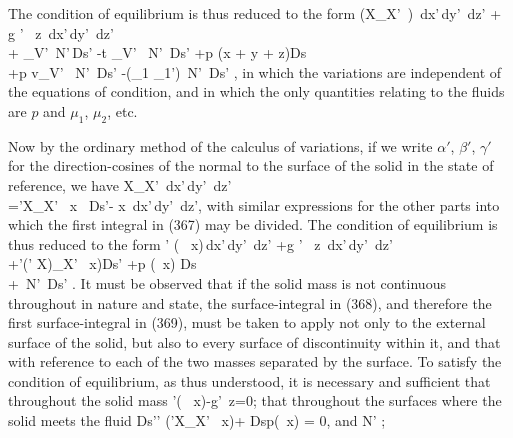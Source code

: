\documentclass[12pt]{article}
\begin{document}
The condition of equilibrium is thus reduced to the form
\eqs \int \int \int \left(X_{X'}\, \delta {} \right) \,dx'\,dy'\, dz' + \int \int \int g \Gamma' \, \delta z \,dx'\,dy'\, dz'\\
+ \int \epsilon_{V'} \,\delta N'\,Ds' -\int t \eta_{V'} \, \delta N'\, Ds' +\int p \left(\alpha \delta x + \beta \delta y + \gamma \delta z\right)Ds\\
+\int p v_{V'} \, \delta N'\, Ds' -\int (\mu_1 \Gamma_1')\, \delta N'\, Ds'  , \label{367}\eqe
in which the variations are independent of the equations of condition, and in which the only quantities relating to the fluids are $p$ and $\mu_1$, $\mu_2$, etc.


Now by the ordinary method of the calculus of variations, if we write $\alpha'$, $\beta'$, $\gamma'$ for the direction-cosines of the normal to the surface of the solid in the state of reference, we have
\eqs \int \int \int X_{X'} \delta {} \,dx'\,dy'\, dz'\\
=\int \alpha'X_{X'} \, \delta x \, Ds'-\int \int \int  {} \delta x \,dx'\,dy'\, dz', \label{368}\eqe
with similar expressions for the other parts into which the first integral in (367) may be divided. The condition of equilibrium is thus reduced to the form
\eqs \int \int \int \sum \sum\nolimits' \left(  \, \delta x\right)\,dx'\,dy'\, dz' 
+\int \int \int g \Gamma' \, \delta z \,dx'\,dy'\, dz'\\
+\int \sum \sum\nolimits'(\alpha' X)_{X'} \, \delta x)Ds' +\int p \sum (\alpha \, \delta x) Ds\\
+\int {} \, \delta N'\, Ds' .   \label{369}\eqe
It must be observed that if the solid mass is not continuous throughout in nature and state, the surface-integral in (368), and therefore the first surface-integral in (369), must be taken to apply not only to the external surface of the solid, but also to every surface of discontinuity within it, and that with reference to each of the two masses separated by the surface. To satisfy the condition of equilibrium, as thus understood, it is necessary and sufficient that throughout the solid mass
\eqs \sum \sum\nolimits'\left(  \, \delta x\right)-g\Gamma' \,\delta z=0;       \label{370}\eqe
that throughout the surfaces where the solid meets the fluid
\eqs Ds'\sum \sum\nolimits' (\alpha'X_{X'} \, \delta x)+ Dsp\sum(\alpha \, \delta x) = 0,  \label{371}\eqe
and   \eqs {} \delta N' ; \label{372}\eqe
\end{document}
